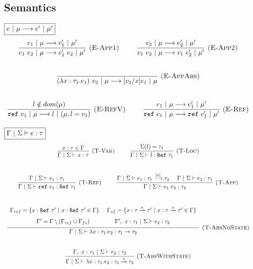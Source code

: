 \documentclass{llncs}
\newcommand{\reftt}{\mathtt{ref}~}
\newcommand{\Reftt}{\mathtt{Ref}~}
\begin{document}
\subsection{Semantics}

$\fbox{$e~|~\mu \longrightarrow e'~|~\mu'$}$
\[
\begin{array}{c}
\infer[\textsc{(E-App1)}]
  {e_1~e_2~|~\mu \longrightarrow e_1'~e_2~|~\mu'}
  {e_1~|~\mu \longrightarrow e_1'~|~\mu'} 
~~~~~~~~
\infer[\textsc{(E-App2)}]
  {v_1~e_2~|~\mu \longrightarrow v_1~e_2'~|~\mu'}
  {e_2~|~\mu \longrightarrow e_2'~|~\mu'}\\[5ex]

\infer[\textsc{(E-AppAbs)}]
  {(\lambda x : \tau_1.e_1)~v_2~|~\mu \longrightarrow [v_2/x]e_1~|~\mu}
  { }\\[5ex]

\infer[\textsc{(E-RefV)}]
  {\reftt v_1~|~\mu \longrightarrow l ~|~(\mu, l = v_1)}
  {l \notin dom(\mu)}
~~~~~~~~
\infer[\textsc{(E-Ref)}]
  {\reftt e_1~|~\mu \longrightarrow \reftt e_1'~|~\mu'}
  {e_1~|~\mu \longrightarrow e_1'~|~\mu'}
\end{array}
\]

$\fbox{$\Gamma~|~\Sigma \vdash e : \tau$}$
\[
\begin{array}{c}
\infer[\textsc{(T-Var)}]
  {\Gamma~|~\Sigma \vdash x : \tau}
  {x : \tau \in \Gamma}
~~~~~~~~  
\infer[\textsc{(T-Loc)}]
  {\Gamma~|~\Sigma \vdash l : \Reftt \tau_1}
  {\Sigma(l) = \tau_1}\\[5ex]

\infer[\textsc{(T-Ref)}]
  {\Gamma~|~\Sigma \vdash \reftt e_1 : \Reftt \tau_1}
  {\Gamma~|~\Sigma \vdash e_1 : \tau_1}
~~~~~~~~
\infer[\textsc{(T-App)}]
  {\Gamma~|~\Sigma \vdash e_1~e_2 : \tau_2}
  {\Gamma~|~\Sigma \vdash e_1 : \tau_1 \xrightarrow{[s]} \tau_2
  ~~~~ \Gamma~|~\Sigma \vdash e_2 : \tau_1}\\[5ex]

\infer[\textsc{(T-AbsNoState)}]
  {\Gamma~|~\Sigma \vdash \lambda x : \tau_1.e_2 : \tau_1 \rightarrow \tau_2}
  {\def\arraystretch{1.6}
  \begin{array}{c}
\Gamma_{ref} = \{x : \Reftt \tau'~|~ x : \Reftt \tau' \in \Gamma\}~~~~
\Gamma_{sf} = \{ x : \tau \xrightarrow{s} \tau'~|~x : \tau \xrightarrow{s} \tau' \in \Gamma \} \\
\Gamma' = \Gamma \setminus (\Gamma_{ref} \cup \Gamma_{fs})~~~~~~~~~~~~~\Gamma',~x : \tau_1~|~\Sigma \vdash e_2 : \tau_2
  \end{array}}\\[5ex]

\infer[\textsc{(T-AbsWithState)}]
  {\Gamma~|~\Sigma \vdash \lambda x : \tau_1.e_2 : \tau_1 \xrightarrow{s} \tau_2}
  {\Gamma,~x : \tau_1~|~\Sigma \vdash e_2 : \tau_2}\\[5ex]

\end{array}
\]
\end{document}
